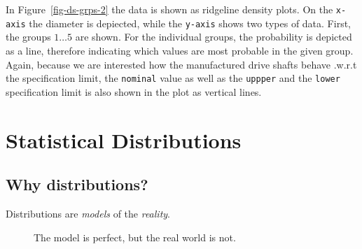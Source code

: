 \documentclass[
  a4paper,
]{scrbook}
\begin{document}
In Figure~\ref{fig-ds-grps-2} the data is shown as ridgeline density
plots. On the \texttt{x-axis} the diameter is depiected, while the
\texttt{y-axis} shows two types of data. First, the groups \(1\ldots5\)
are shown. For the individual groups, the probability is depicted as a
line, therefore indicating which values are most probable in the given
group. Again, because we are interested how the manufactured drive
shafts behave .w.r.t the specification limit, the \texttt{nominal} value
as well as the \texttt{uppper} and the \texttt{lower} specification
limit is also shown in the plot as vertical lines.


\chapter{Statistical Distributions}\label{statistical-distributions}

\section{Why distributions?}\label{why-distributions}

Distributions are \emph{models} of the \emph{reality}.

\begin{figure}[ht]


\caption{\label{fig-intro}The model is perfect, but the real world is
not.}

\end{figure}%
\end{document}
